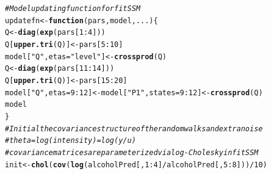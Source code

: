 \documentclass[nojss,article]{jss}\usepackage[]{graphicx}\usepackage[]{color}
\makeatletter
\newcommand{\hlnum}[1]{\textcolor[rgb]{0.686,0.059,0.569}{#1}}%
\newcommand{\hlstr}[1]{\textcolor[rgb]{0.192,0.494,0.8}{#1}}%
\newcommand{\hlcom}[1]{\textcolor[rgb]{0.678,0.584,0.686}{\textit{#1}}}%
\newcommand{\hlopt}[1]{\textcolor[rgb]{0,0,0}{#1}}%
\newcommand{\hlstd}[1]{\textcolor[rgb]{0.345,0.345,0.345}{#1}}%
\newcommand{\hlkwa}[1]{\textcolor[rgb]{0.161,0.373,0.58}{\textbf{#1}}}%
\newcommand{\hlkwb}[1]{\textcolor[rgb]{0.69,0.353,0.396}{#1}}%
\newcommand{\hlkwc}[1]{\textcolor[rgb]{0.333,0.667,0.333}{#1}}%
\newcommand{\hlkwd}[1]{\textcolor[rgb]{0.737,0.353,0.396}{\textbf{#1}}}%
\newenvironment{kframe}{%
 \def\at@end@of@kframe{}%
 \ifinner\ifhmode%
  \def\at@end@of@kframe{\end{minipage}}%
  \begin{minipage}{\columnwidth}%
 \fi\fi%
 \def\FrameCommand##1{\hskip\@totalleftmargin \hskip-\fboxsep
 \colorbox{shadecolor}{##1}\hskip-\fboxsep
     \hskip-\linewidth \hskip-\@totalleftmargin \hskip\columnwidth}%
 \MakeFramed {\advance\hsize-\width
   \@totalleftmargin\z@ \linewidth\hsize
   \@setminipage}}%
 {\par\unskip\endMakeFramed%
 \at@end@of@kframe}
\newenvironment{knitrout}{}{} %
\makeatother
\begin{document}
\begin{knitrout}
\begin{kframe}
\begin{alltt}
\hlcom{# Model updating function for fitSSM}
\hlstd{updatefn} \hlkwb{<-} \hlkwa{function}\hlstd{(}\hlkwc{pars}\hlstd{,} \hlkwc{model}\hlstd{,} \hlkwc{...}\hlstd{)\{}
  \hlstd{Q} \hlkwb{<-} \hlkwd{diag}\hlstd{(}\hlkwd{exp}\hlstd{(pars[}\hlnum{1}\hlopt{:}\hlnum{4}\hlstd{]))}
  \hlstd{Q[}\hlkwd{upper.tri}\hlstd{(Q)]} \hlkwb{<-} \hlstd{pars[}\hlnum{5}\hlopt{:}\hlnum{10}\hlstd{]}
  \hlstd{model[}\hlstr{"Q"}\hlstd{,}\hlkwc{etas}\hlstd{=}\hlstr{"level"}\hlstd{]} \hlkwb{<-} \hlkwd{crossprod}\hlstd{(Q)}
  \hlstd{Q} \hlkwb{<-} \hlkwd{diag}\hlstd{(}\hlkwd{exp}\hlstd{(pars[}\hlnum{11}\hlopt{:}\hlnum{14}\hlstd{]))}
  \hlstd{Q[}\hlkwd{upper.tri}\hlstd{(Q)]} \hlkwb{<-} \hlstd{pars[}\hlnum{15}\hlopt{:}\hlnum{20}\hlstd{]}
  \hlstd{model[}\hlstr{"Q"}\hlstd{,}\hlkwc{etas}\hlstd{=}\hlnum{9}\hlopt{:}\hlnum{12}\hlstd{]} \hlkwb{<-} \hlstd{model[}\hlstr{"P1"}\hlstd{,}\hlkwc{states}\hlstd{=}\hlnum{9}\hlopt{:}\hlnum{12}\hlstd{]} \hlkwb{<-} \hlkwd{crossprod}\hlstd{(Q)}
  \hlstd{model}
\hlstd{\}}
\hlcom{# Initial the covariance structure of the random walks and extra noise}
\hlcom{# theta = log(intensity) = log(y/u)}
\hlcom{# covariance matrices are parameterized via log-Cholesky in fitSSM}
\hlstd{init} \hlkwb{<-} \hlkwd{chol}\hlstd{(}\hlkwd{cov}\hlstd{(}\hlkwd{log}\hlstd{(alcoholPred[,}\hlnum{1}\hlopt{:}\hlnum{4}\hlstd{]}\hlopt{/}\hlstd{alcoholPred[,}\hlnum{5}\hlopt{:}\hlnum{8}\hlstd{]))}\hlopt{/}\hlnum{10}\hlstd{)}


\end{alltt}
\end{kframe}
\end{knitrout}
\end{document}
